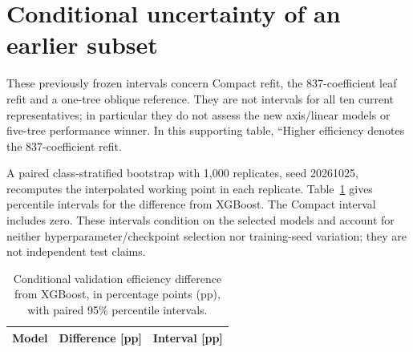 \section{Conditional uncertainty of an earlier subset}
\label{app:uncertainty}
These previously frozen intervals concern Compact refit, the 837-coefficient
leaf refit and a one-tree oblique reference. They are not intervals for all ten
current representatives; in particular they do not assess the new axis/linear
models or five-tree performance winner. In this supporting table, ``Higher
efficiency denotes the 837-coefficient refit.

A paired class-stratified bootstrap with 1,000 replicates, seed 20261025,
recomputes the interpolated working point in each replicate.
Table~\ref{tab:uncertainty} gives percentile intervals for the difference from
XGBoost. The Compact interval includes zero. These intervals condition on the
selected models and account for neither hyperparameter/checkpoint selection
nor training-seed variation; they are not independent test claims.
\begin{table}[H]\centering\small
\caption{Conditional validation efficiency difference from XGBoost, in
percentage points (pp), with paired 95\% percentile intervals.}
\label{tab:uncertainty}
\begin{tabular}{@{}lrr@{}}\toprule
Model & Difference [pp] & Interval [pp]\\\midrule
\end{tabular}
\end{table}
